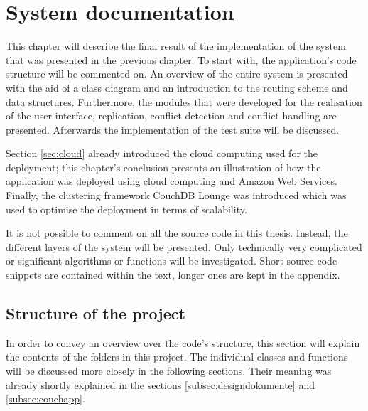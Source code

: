 \chapter{System documentation}
\label{chap:systemdokumentation}


This chapter will describe the final result of the implementation of the system that was presented in the previous chapter. To start with, the application's code structure will be commented on. An overview of the entire system is presented with the aid of a class diagram and an introduction to the routing scheme and data structures. Furthermore, the modules that were developed for the realisation of the user interface, replication, conflict detection and conflict handling are presented. Afterwards the implementation of the test suite will be discussed.

Section \ref{sec:cloud} already introduced the cloud computing used for the deployment; this chapter's conclusion presents an illustration of how the application was deployed using cloud computing and Amazon Web Services. Finally, the clustering framework CouchDB Lounge was introduced which was used to optimise the deployment in terms of scalability.

It is not possible to comment on all the source code in this thesis. Instead, the different layers of the system will be presented. Only technically very complicated or significant algorithms or functions will be investigated. Short source code snippets are contained within the text, longer ones are kept in the appendix.


\section{Structure of the project}

In order to convey an overview over the code's structure, this section will explain the contents of the folders in this project. The individual classes and functions will be discussed more closely in the following sections. Their meaning was already shortly explained in the sections \ref{subsec:designdokumente} and \ref{subsec:couchapp}.


